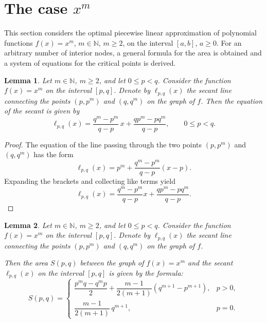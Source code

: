 \documentclass[amstex,16pt, amssymb]{article}
\theoremstyle{plain}
\newtheorem{lemma}{Lemma}[section]
\theoremstyle{definition}
\numberwithin{equation}{section}
\numberwithin{equation}{section}
\begin{document}
\section{The  case $x^m$}

This section considers the optimal piecewise linear approximation of polynomial functions \(f(x)=x^m\), \(m\in\mathbb{N}\), \(m\geq 2\), on the interval \([a,b]\), \(a\geq 0\). For an arbitrary number of interior nodes, a general formula for the area is obtained and a system of equations for the critical points is derived.


\begin{lemma}\label{lemma6}
Let $m \in \mathbb{N}$, $m \ge 2$, and let $0 \le p < q$. Consider the function $f(x) = x^m$ on the interval $[p, q]$. Denote by $\ell_{p,q}(x)$ the secant line connecting the points $(p, p^m)$ and $(q, q^m)$ on the graph of $f$. Then the equation of the secant is given by
\[
\ell_{p,q}(x)=\frac{q^{m}-p^{m}}{q-p}\,x+\frac{qp^{m}-pq^{m}}{q-p},
\qquad 0 \le p < q.
\]
\end{lemma}


\begin{proof}
The equation of the line passing through the two points $(p, p^m)$ and $(q, q^m)$ has the form
\[
\ell_{p,q}(x) = p^m + \frac{q^m - p^m}{q - p}(x - p).
\]
Expanding the brackets and collecting like terms yield
\[
\ell_{p,q}(x) = \frac{q^m - p^m}{q - p} x + \frac{ q p^m-p q^m }{q - p}.
\]
\end{proof}

\begin{lemma}\label{lemma7}
Let $m \in \mathbb{N}$, $m \ge 2$, and let $0 \le p < q$. Consider the function $f(x) = x^m$ on the interval $[p, q]$. Denote by $\ell_{p,q}(x)$ the secant line connecting the points $(p, p^m)$ and $(q, q^m)$ on the graph of $f$.

Then the area $S(p,q)$ between the graph of $f(x) = x^m$ and the secant $\ell_{p,q}(x)$ on the interval $[p, q]$ is given by the formula:
\[
S(p,q) =
\begin{cases}
\dfrac{p^m q - q^m p}{2} + \dfrac{m-1}{2(m+1)}(q^{m+1} - p^{m+1}), & p > 0, \\[1.5ex]
\dfrac{m-1}{2(m+1)}\, q^{m+1}, & p = 0.
\end{cases}
\]
\end{lemma}
\end{document}

